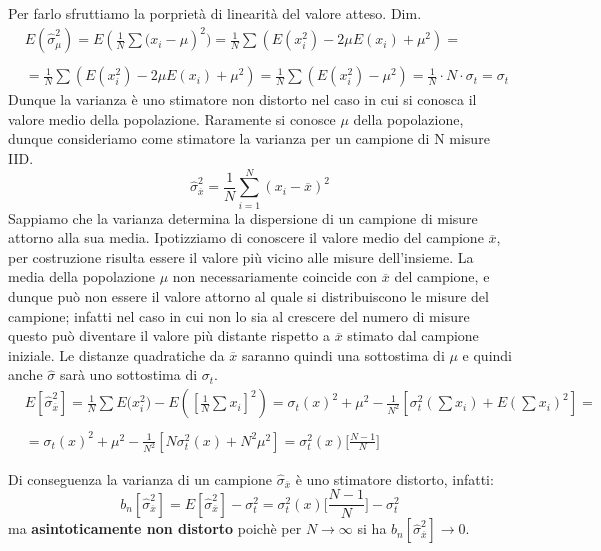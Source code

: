 \noindent Per farlo sfruttiamo la porpriet\`{a} di linearit\`{a} del valore atteso.
\newline
Dim.
\begin{align*}	
		& E(\hat{\sigma}_{\mu}^2) = E(\frac{1}{N} \sum{(x_{i}-\mu})^2) = \frac{1}{N}\sum(E(x_i^2) - 2\mu E(x_i)+\mu^2) =
		\\
		\\
		 & = \frac{1}{N}\sum(E(x_i^2) - 2\mu E(x_i)+\mu^2) = \frac{1}{N}\sum(E(x_i^2) -\mu^2) = \frac{1}{N} \cdot N \cdot \sigma_t = \sigma_t
\end{align*}
\newline
\noindent Dunque la varianza \`{e} uno stimatore non distorto nel caso in cui si conosca il valore medio della popolazione. Raramente si conosce $\mu$ della popolazione, dunque consideriamo come stimatore la varianza per un campione di N misure IID.
\begin{equation*}
	\hat{\sigma}_{\overline{x}}^2 = \dfrac{1}{N}\sum_{i=1}^N(x_i - \overline{x})^2	
\end{equation*}
\newline
\noindent Sappiamo che la varianza determina la dispersione di un campione di misure attorno alla sua media. Ipotizziamo di conoscere il valore medio del campione $\overline{x}$, per costruzione risulta essere il valore pi\`{u} vicino alle misure dell'insieme. La media della popolazione $\mu$ non necessariamente coincide con $\overline{x}$ del campione, e dunque pu\`{o} non essere il valore attorno al quale si distribuiscono le misure del campione; infatti nel caso in cui non lo sia al crescere del numero di misure questo pu\`{o} diventare il valore pi\`{u} distante rispetto a $\overline{x}$ stimato dal campione iniziale. Le distanze quadratiche da  $\overline{x}$ saranno quindi una sottostima di $\mu$ e quindi anche $\hat{\sigma}$ sar\`{a} uno sottostima di $\sigma_t$.  
 \begin{align*}
		&E[\hat{\sigma}_{\overline{x}}^2] = \frac{1}{N} \sum{E(x_{i}^2}) - E([\frac{1}{N}\sum{x}_{i}]^2) = \sigma_{t}(x)^2 + \mu^2 - \frac{1}{N^2}[\sigma_{t}^2(\sum{x_{i}}) + E(\sum{x_{i}})^2] = 
		\\
		\\
		&= \sigma_{t}(x)^2 + \mu^2 - \frac{1}{N^2}[N\sigma_{t}^2(x) + N^2 \mu^2] = \sigma_{t}^2(x) \Big[\frac{N-1}{N} \Big ] 
\end{align*}
 
\noindent Di conseguenza la varianza di un campione $\hat{\sigma}_{\overline{x}}$ \`{e} uno stimatore distorto, infatti:
\begin{equation*}
	b_n[\hat{\sigma}_{\overline{x}}^2] = E[\hat{\sigma}_{\overline{x}}^2] - \sigma_{t}^2 = \sigma_{t}^2(x) \Big[\frac{N-1}{N} \Big ] - \sigma_{t}^2 
\end{equation*}
ma \textbf{asintoticamente non distorto} poich\`{e} per $N \rightarrow \infty $ si ha $b_n[\hat{\sigma}_{\overline{x}}^2] \rightarrow 0$.
\newline

